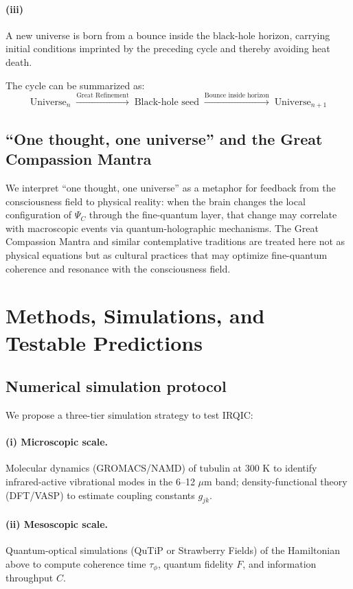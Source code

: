 \documentclass[11pt,a4paper]{article}
\begin{document}
\paragraph{(iii)} A new universe is born from a bounce inside the black-hole horizon, carrying initial conditions imprinted by the preceding cycle and thereby avoiding heat death.

The cycle can be summarized as:
\begin{equation}
\text{Universe}_n \;\xrightarrow{\text{Great Refinement}}\; \text{Black-hole seed} \;\xrightarrow{\text{Bounce inside horizon}}\; \text{Universe}_{n+1}
\end{equation}

\subsection{``One thought, one universe'' and the Great Compassion Mantra}

We interpret ``one thought, one universe'' as a metaphor for feedback from the consciousness field to physical reality: when the brain changes the local configuration of $\Psi_C$ through the fine-quantum layer, that change may correlate with macroscopic events via quantum-holographic mechanisms. The Great Compassion Mantra and similar contemplative traditions are treated here not as physical equations but as cultural practices that may optimize fine-quantum coherence and resonance with the consciousness field.

\section{Methods, Simulations, and Testable Predictions}

\subsection{Numerical simulation protocol}

We propose a three-tier simulation strategy to test IRQIC:

\paragraph{(i) Microscopic scale.} Molecular dynamics (GROMACS/NAMD) of tubulin at 300 K to identify infrared-active vibrational modes in the 6--12 $\mu$m band; density-functional theory (DFT/VASP) to estimate coupling constants $g_{jk}$.

\paragraph{(ii) Mesoscopic scale.} Quantum-optical simulations (QuTiP or Strawberry Fields) of the Hamiltonian above to compute coherence time $\tau_\phi$, quantum fidelity $F$, and information throughput $C$.
\end{document}
